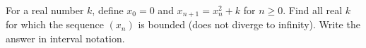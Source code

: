 For a real number $k$, define $x_0=0$ and $x_{n+1}=x_n^2+k$ for $n\ge0$. Find all real $k$ for which the sequence $(x_n)$ is bounded (does not diverge to infinity). Write the answer in interval notation.
